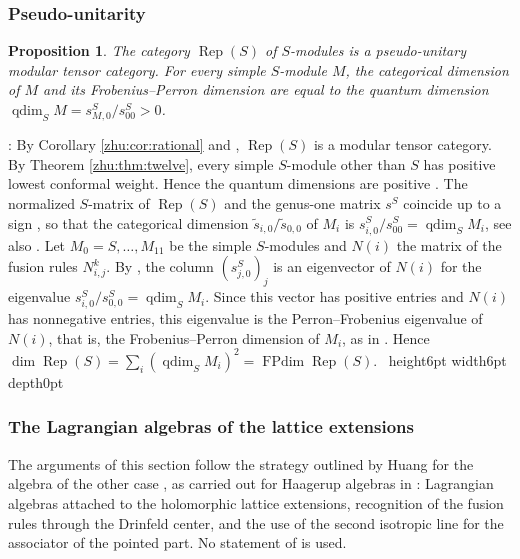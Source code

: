 \documentclass[leqno]{article}
\newcommand{\qed}{\hfill \vrule height6pt  width6pt depth0pt}
\DeclareMathOperator{\Rep}{Rep}
\newtheorem{prop}[thm]{Proposition}
\newenvironment{proof}[1][]{\noindent {\it Proof #1} : }{\hbox{~}\qed
\smallskip
}
\numberwithin{equation}{section}
\begin{document}
\subsubsection{Pseudo-unitarity}
\label{zhu:subsec:pseudo}

\begin{prop}
\label{zhu:prop:pseudo}
The category $\Rep(S)$ of $S$-modules is a pseudo-unitary modular tensor category. For every simple $S$-module $M$, the categorical dimension of $M$ and its Frobenius--Perron dimension are equal to the quantum dimension $\operatorname{qdim}_S M = s^S_{M,0}/s^S_{00} > 0$.
\end{prop}

\begin{proof}
By Corollary \ref{zhu:cor:rational} and \cite[Theorem 4.6]{Hua08}, $\Rep(S)$ is a modular tensor category. By Theorem \ref{zhu:thm:twelve}, every simple $S$-module other than $S$ has positive lowest conformal weight. Hence the quantum dimensions are positive \cite[Lemma 4.2 p.~6453]{DJX13}. The normalized $S$-matrix of $\Rep(S)$ and the genus-one matrix $s^S$ coincide up to a sign \cite[Theorem 3.10 p.~2142]{DLN15}, so that the categorical dimension $\tilde s_{i,0}/\tilde s_{0,0}$ of $M_i$ is $s^S_{i,0}/s^S_{00} = \operatorname{qdim}_S M_i$, see also \cite[p.~5]{CKM22}. Let $M_0 = S, \ldots, M_{11}$ be the simple $S$-modules and $N(i)$ the matrix of the fusion rules $N_{i,j}^k$. By \cite[Theorem 4.1 p.~6452]{DJX13}, the column $(s^S_{j,0})_j$ is an eigenvector of $N(i)$ for the eigenvalue $s^S_{i,0}/s^S_{0,0} = \operatorname{qdim}_S M_i$. Since this vector has positive entries and $N(i)$ has nonnegative entries, this eigenvalue is the Perron--Frobenius eigenvalue of $N(i)$, that is, the Frobenius--Perron dimension of $M_i$, as in \cite[Remarks 5.3 and 5.4 p.~6460]{DJX13}. Hence $\dim \Rep(S) = \sum_i (\operatorname{qdim}_S M_i)^2 = \operatorname{FPdim}\Rep(S)$.
\end{proof}

\subsubsection{The Lagrangian algebras of the lattice extensions}
\label{zhu:subsec:lagrangian}

The arguments of this section follow the strategy outlined by Huang for the algebra of the other case \cite[Sections 5 and 6 pp.~7--9]{Hua26}, as carried out for Haagerup algebras in \cite[Sections 3 and 6]{ArhII}: Lagrangian algebras attached to the holomorphic lattice extensions, recognition of the fusion rules through the Drinfeld center, and the use of the second isotropic line for the associator of the pointed part. No statement of \cite{Hua26} is used.
\end{document}
